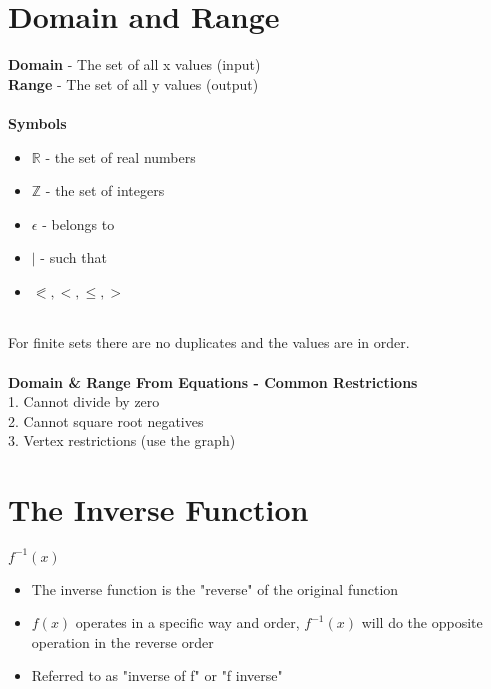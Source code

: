 \documentclass{article}
\begin{document}

\newpage
\section{Domain and Range}

\textbf{Domain} - The set of all x values (input) \\
\textbf{Range} - The set of all y values (output) \\\\
\textbf{Symbols}
\begin{itemize}
    \item $\mathbb{R}$ - the set of real numbers
    \item $\mathbb{Z}$ - the set of integers
    \item $\epsilon$ - belongs to
    \item $\mid$ - such that
    \item $\eqslantless, <, \leqslant, >$
\end{itemize}

\noindent
\\For finite sets there are no duplicates and the values are in order.\\\\

\noindent
\textbf{Domain \& Range From Equations - Common Restrictions}\\
1. Cannot divide by zero\\
2. Cannot square root negatives\\
3. Vertex restrictions (use the graph)\\


\section{The Inverse Function}

$f^{-1}(x)$
\begin{itemize}
    \item The inverse function is the "reverse" of the original function
    \item $f(x)$ operates in a specific way and order, $f^{-1}(x)$ will do the opposite operation in the reverse order
    \item Referred to as "inverse of f" or "f inverse"
\end{itemize} 
\end{document}
